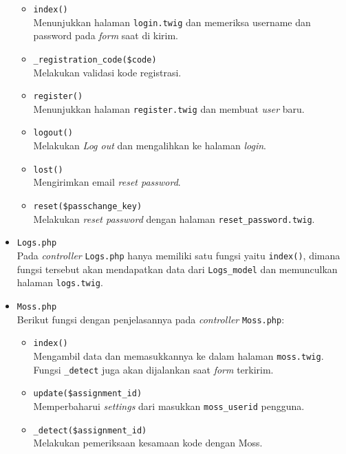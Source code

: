 \begin{itemize}
            \begin{itemize}
                  \item \verb|index()| \\
                        Menunjukkan halaman \verb|login.twig| dan memeriksa username dan password pada \textit{form} saat di kirim.
                  \item \verb|_registration_code($code)| \\
                        Melakukan validasi kode registrasi.
                  \item \verb|register()| \\
                        Menunjukkan halaman \verb|register.twig| dan membuat \textit{user} baru.
                  \item \verb|logout()| \\
                        Melakukan \textit{Log out} dan mengalihkan ke halaman \textit{login}.
                  \item \verb|lost()| \\
                        Mengirimkan email \textit{reset password}.
                  \item \verb|reset($passchange_key)| \\
                        Melakukan \textit{reset password} dengan halaman \verb|reset_password.twig|.
            \end{itemize}

      \item \verb|Logs.php| \\
            Pada \textit{controller} \verb|Logs.php| hanya memiliki satu fungsi yaitu \verb|index()|, dimana fungsi tersebut akan mendapatkan data dari \verb|Logs_model| dan memunculkan halaman \verb|logs.twig|.

      \item \verb|Moss.php| \\
            Berikut fungsi dengan penjelasannya pada \textit{controller} \verb|Moss.php|:

            \begin{itemize}
                  \item \verb|index()| \\
                        Mengambil data dan memasukkannya ke dalam halaman \verb|moss.twig|. Fungsi \verb|_detect| juga akan dijalankan saat \textit{form} terkirim.
                  \item \verb|update($assignment_id)| \\
                        Memperbaharui \textit{settings} dari masukkan \verb|moss_userid| pengguna.
                  \item \verb|_detect($assignment_id)| \\
                        Melakukan pemeriksaan kesamaan kode dengan Moss.
            \end{itemize}


\end{itemize}
